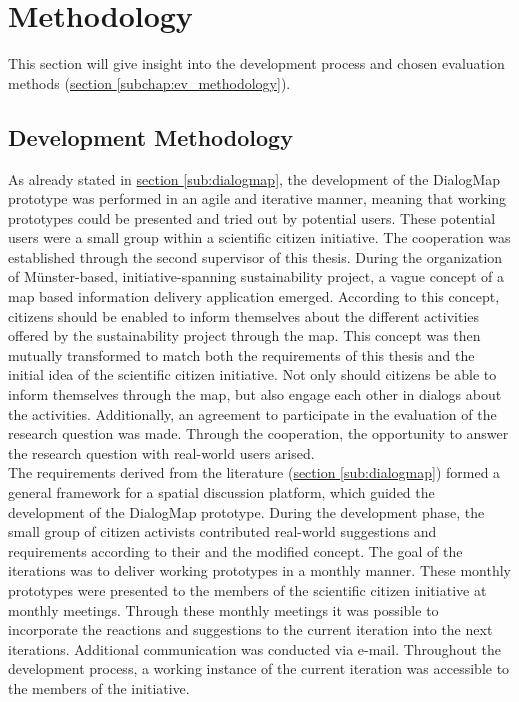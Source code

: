 \section{Methodology}
\label{chap:methodology}
This section will give insight into the development process and chosen evaluation methods (\hyperref[subchap:ev_methodology]{section \ref{subchap:ev_methodology}}).

\subsection{Development Methodology}
As already stated in \hyperref[sub:dialogmap]{section \ref{sub:dialogmap}}, the development of the DialogMap prototype was performed in an agile and iterative manner, meaning that working prototypes could be presented and tried out by potential users. These potential users were a small group within a scientific citizen initiative. The cooperation was established through the second supervisor of this thesis. During the organization of Münster-based, initiative-spanning sustainability project, a vague concept of a map based information delivery application emerged. According to this concept, citizens should be enabled to inform themselves about the different activities offered by the sustainability project through the map. This concept was then mutually transformed to match both the requirements of this thesis and the initial idea of the scientific citizen initiative. Not only should citizens be able to inform themselves through the map, but also engage each other in dialogs about the activities. Additionally, an agreement to participate in the evaluation of the research question was made. Through the cooperation, the opportunity to answer the research question with real-world users arised.\\
The requirements derived from the literature (\hyperref[sub:dialogmap]{section \ref{sub:dialogmap}}) formed a general framework for a spatial discussion platform, which guided the development of the DialogMap prototype. During the development phase, the small group of citizen activists contributed real-world suggestions and requirements according to their and the modified concept. The goal of the iterations was to deliver working prototypes in a monthly manner. These monthly prototypes were presented to the members of the scientific citizen initiative at monthly meetings. Through these monthly meetings it was possible to incorporate the reactions and suggestions to the current iteration into the next iterations. Additional communication was conducted via e-mail. Throughout the development process, a working instance of the current iteration was accessible to the members of the initiative.\\

